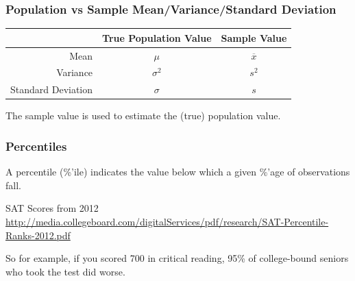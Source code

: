 \documentclass[handout]{beamer}
\newcommand{\blue}[1]{\textcolor{blue2}{#1}}
\begin{document}
\begin{frame}[fragile]
\frametitle{Population vs Sample Mean/Variance/Standard Deviation}

\begin{center}
  \begin{tabular}{r|cc}
	\hline	
     & True Population Value & Sample Value \\ 
	\hline	
    Mean & $\mu$ & $\overline{x}$ \\ 
    Variance & $\sigma^2$ & $s^2$ \\ 
    Standard Deviation & $\sigma$ & $s$ \\ 
	\hline	
  \end{tabular}
\end{center}

\pause The sample value is used to \blue{estimate} the (true) population value.  

\end{frame}


\begin{frame}
\frametitle{Percentiles}
A percentile (\%'ile) indicates the value \blue{below} which a given \%'age of observations fall.  

\vspace{0.5cm}

\pause SAT Scores from 2012 \blue{\url{http://media.collegeboard.com/digitalServices/pdf/research/SAT-Percentile-Ranks-2012.pdf}}

\vspace{0.5cm}

\pause So for example, if you scored 700 in critical reading, 95\% of college-bound seniors who took the test did worse.

\end{frame}
\end{document}

